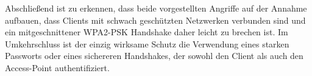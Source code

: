 Abschließend ist zu erkennen, dass beide vorgestellten Angriffe auf der Annahme aufbauen, dass Clients mit schwach geschützten Netzwerken verbunden sind und ein mitgeschnittener WPA2-PSK Handshake daher leicht zu brechen ist.
Im Umkehrschluss ist der einzig wirksame Schutz die Verwendung eines starken Passworts oder eines sichereren Handshakes, der sowohl den Client als auch den Access-Point authentifiziert.


